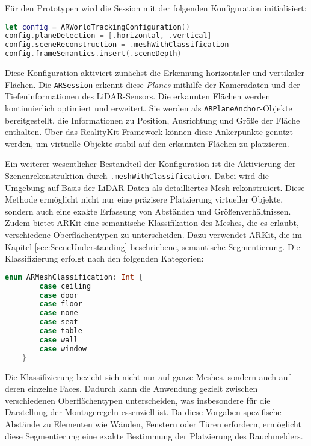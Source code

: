 Für den Prototypen wird die Session mit der folgenden Konfiguration initialisiert:

\begin{lstlisting}[language=Swift]
let config = ARWorldTrackingConfiguration()
config.planeDetection = [.horizontal, .vertical]
config.sceneReconstruction = .meshWithClassification
config.frameSemantics.insert(.sceneDepth)
\end{lstlisting}

Diese Konfiguration aktiviert zunächst die Erkennung horizontaler und vertikaler Flächen. Die \texttt{ARSession} erkennt diese \textit{Planes} mithilfe der Kameradaten und der Tiefeninformationen des LiDAR-Sensors. Die erkannten Flächen werden kontinuierlich optimiert und erweitert. Sie werden als \texttt{ARPlaneAnchor}-Objekte bereitgestellt, die Informationen zu Position, Ausrichtung und Größe der Fläche enthalten. Über das RealityKit-Framework können diese Ankerpunkte genutzt werden, um virtuelle Objekte stabil auf den erkannten Flächen zu platzieren.

Ein weiterer wesentlicher Bestandteil der Konfiguration ist die Aktivierung der Szenenrekonstruktion durch \texttt{.meshWithClassification}. Dabei wird die Umgebung auf Basis der LiDAR-Daten als detailliertes Mesh rekonstruiert. Diese Methode ermöglicht nicht nur eine präzisere Platzierung virtueller Objekte, sondern auch eine exakte Erfassung von Abständen und Größenverhältnissen. Zudem bietet ARKit eine semantische Klassifikation des Meshes, die es erlaubt, verschiedene Oberflächentypen zu unterscheiden. Dazu verwendet ARKit, die im Kapitel \ref{sec:SceneUnderstanding} beschriebene, semantische Segmentierung. Die Klassifizierung erfolgt nach den folgenden Kategorien:

\begin{lstlisting}[language=Swift]
    enum ARMeshClassification: Int {
        case ceiling
        case door
        case floor
        case none
        case seat
        case table  
        case wall
        case window
    }
\end{lstlisting}

Die Klassifizierung bezieht sich nicht nur auf ganze Meshes, sondern auch auf deren einzelne Faces. Dadurch kann die Anwendung gezielt zwischen verschiedenen Oberflächentypen unterscheiden, was insbesondere für die Darstellung der Montageregeln essenziell ist. Da diese Vorgaben spezifische Abstände zu Elementen wie Wänden, Fenstern oder Türen erfordern, ermöglicht diese Segmentierung eine exakte Bestimmung der Platzierung des Rauchmelders.

